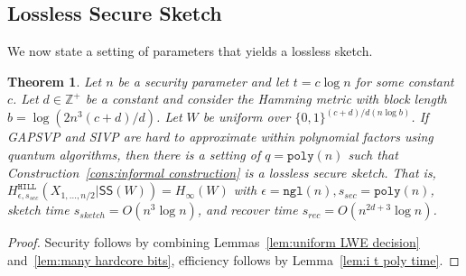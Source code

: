 \documentclass[11pt]{article}
\newcommand{\lemref}[1]{\mbox{Lemma~\ref{#1}}}
\newcommand{\consref}[1]{\mbox{Construction~\ref{#1}}}
\newcommand{\class}[1]{{\ensuremath{\mathsf{#1}}}}
\newcommand{\sketch}{\ensuremath{\class{SS}}\xspace}
\newcommand{\zo}{\ensuremath{\{0, 1\}}}
\newcommand{\hill}{\ensuremath{\mathtt{HILL}}\xspace}
\newcommand{\poly}{\ensuremath{\mathtt{poly}}\xspace}
\newcommand{\ngl}{\ensuremath{\mathtt{ngl}}\xspace}
\newcommand{\LWE}{\class{LWE}}
\newtheorem{theorem}{Theorem}[section]
\begin{document}

\subsection{Lossless Secure Sketch}
\label{sec:lossless sketch}
We now state a setting of parameters that yields a lossless sketch.  


\begin{theorem}
\label{thm:lossless secure sketch log}
Let $n$ be a security parameter and let $t = c\log n$ for some constant $c$.  Let $d\in \mathbb{Z}^+$ be a constant and consider the Hamming metric with block length $b = \log (2n^3 (c+d)/d)$.  Let $W$ be uniform over $\zo^{(c+d)/d(n\log b)}$.  If GAPSVP and SIVP are hard to approximate within polynomial factors using quantum algorithms, then there is a setting of $q = \poly(n)$ such that \consref{cons:informal construction} is a lossless secure sketch.  That is, $H^{\hill}_{\epsilon, s_{sec}}(X_{1,..., n/2}|\sketch(W)) = H_\infty(W)$
with 
$\epsilon = \ngl(n), s_{sec} = \poly(n)$,  sketch time $s_{sketch} = O(n^3\log n)$, and recover time $s_{rec}= O(n^{2d+3} \log n)$.
\end{theorem}
\begin{proof}
Security follows by combining Lemmas~\ref{lem:uniform LWE decision} and~\ref{lem:many hardcore bits}, efficiency follows by \lemref{lem:i t poly time}.
\end{proof}
\end{document}
